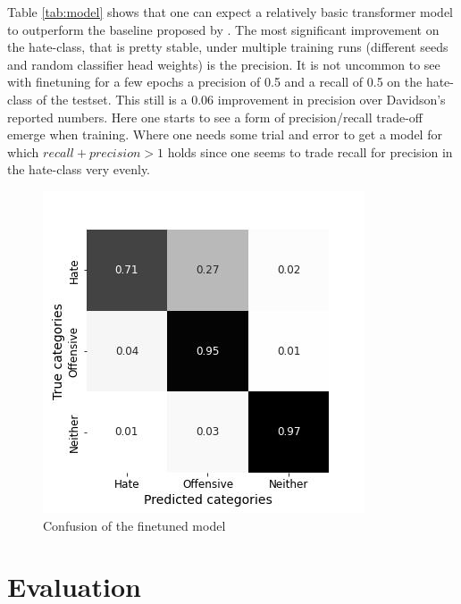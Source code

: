 \documentclass[11pt,a4paper]{article}
\begin{document}
Table \ref{tab:model} shows that one can expect a relatively basic transformer model to outperform the baseline proposed by \cite{auto_hatespeech}.
The most significant improvement on the hate-class, that is pretty stable, under multiple training runs (different seeds and random classifier head weights)
is the precision. It is not uncommon to see with finetuning for a few epochs a precision of 0.5 and a recall of 0.5 on the hate-class of the testset.
This still is a 0.06 improvement in precision over Davidson's reported numbers.
Here one starts to see a form of precision/recall trade-off emerge when training. Where one needs some trial and error to get a model for which 
$ recall + precision > 1 $ holds since one seems to trade recall for precision in the hate-class very evenly.
\begin{figure}[ht]
 \includegraphics[width=\linewidth]{./tables-figures/model_confusion.jpg}
  \caption{Confusion of the finetuned model}
  \label{fig:model_confusion}
\end{figure}

\section{Evaluation}
\end{document}
